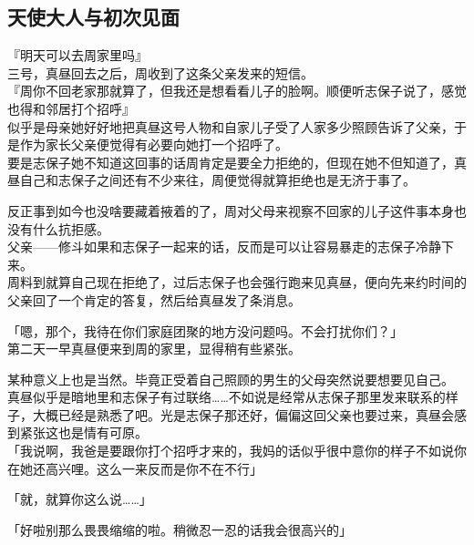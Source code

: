 \subsection{天使大人与初次见面}

『明天可以去周家里吗』\\

三号，真昼回去之后，周收到了这条父亲发来的短信。\\

『周你不回老家那就算了，但我还是想看看儿子的脸啊。顺便听志保子说了，感觉也得和邻居打个招呼』 \\

似乎是母亲她好好地把真昼这号人物和自家儿子受了人家多少照顾告诉了父亲，于是作为家长父亲便觉得有必要向她打一个招呼了。\\

要是志保子她不知道这回事的话周肯定是要全力拒绝的，但现在她不但知道了，真昼自己和志保子之间还有不少来往，周便觉得就算拒绝也是无济于事了。

反正事到如今也没啥要藏着掖着的了，周对父母来视察不回家的儿子这件事本身也没有什么抗拒感。\\

父亲——修斗如果和志保子一起来的话，反而是可以让容易暴走的志保子冷静下来。\\

周料到就算自己现在拒绝了，过后志保子也会强行跑来见真昼，便向先来约时间的父亲回了一个肯定的答复，然后给真昼发了条消息。\\

\vspace{2\baselineskip}

「嗯，那个，我待在你们家庭团聚的地方没问题吗。不会打扰你们？」\\

第二天一早真昼便来到周的家里，显得稍有些紧张。

某种意义上也是当然。毕竟正受着自己照顾的男生的父母突然说要想要见自己。\\

真昼似乎是暗地里和志保子有过联络……不如说是经常从志保子那里发来联系的样子，大概已经是熟悉了吧。光是志保子那还好，偏偏这回父亲也要过来，真昼会感到紧张这也是情有可原。\\

「我说啊，我爸是要跟你打个招呼才来的，我妈的话似乎很中意你的样子不如说你在她还高兴哩。这么一来反而是你不在不行」

「就，就算你这么说……」

「好啦别那么畏畏缩缩的啦。稍微忍一忍的话我会很高兴的」\\

